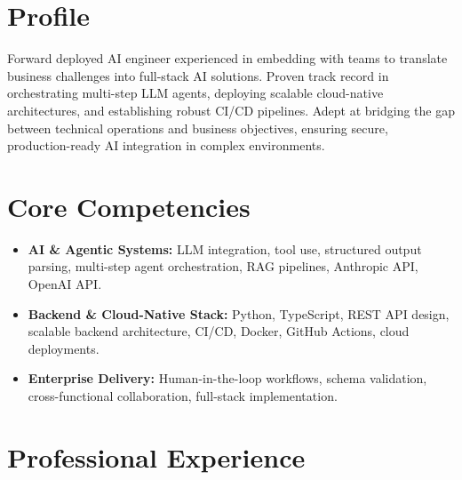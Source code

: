 \documentclass[11pt,a4paper,sans]{moderncv}
\begin{document}
\makecvtitle

\vspace{-2em}
\section{Profile}
Forward deployed AI engineer experienced in embedding with teams to translate business challenges into full-stack AI solutions. Proven track record in orchestrating multi-step LLM agents, deploying scalable cloud-native architectures, and establishing robust CI/CD pipelines. Adept at bridging the gap between technical operations and business objectives, ensuring secure, production-ready AI integration in complex environments.

\section{Core Competencies}
\begin{itemize}
\item \textbf{AI \& Agentic Systems:} LLM integration, tool use, structured output parsing, multi-step agent orchestration, RAG pipelines, Anthropic API, OpenAI API.
\item \textbf{Backend \& Cloud-Native Stack:} Python, TypeScript, REST API design, scalable backend architecture, CI/CD, Docker, GitHub Actions, cloud deployments.
\item \textbf{Enterprise Delivery:} Human-in-the-loop workflows, schema validation, cross-functional collaboration, full-stack implementation.
\end{itemize}

\section{Professional Experience}
\vspace{1pt}
\vspace{3pt}
\end{document}
